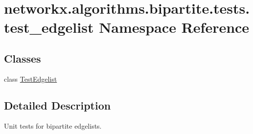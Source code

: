 \hypertarget{namespacenetworkx_1_1algorithms_1_1bipartite_1_1tests_1_1test__edgelist}{}\section{networkx.\+algorithms.\+bipartite.\+tests.\+test\+\_\+edgelist Namespace Reference}
\label{namespacenetworkx_1_1algorithms_1_1bipartite_1_1tests_1_1test__edgelist}
\subsection*{Classes}
\begin{DoxyCompactItemize}
\item 
class \hyperlink{classnetworkx_1_1algorithms_1_1bipartite_1_1tests_1_1test__edgelist_1_1TestEdgelist}{Test\+Edgelist}
\end{DoxyCompactItemize}


\subsection{Detailed Description}
\begin{DoxyVerb}    Unit tests for bipartite edgelists.
\end{DoxyVerb}
 